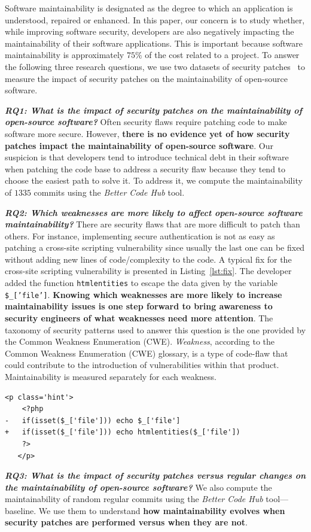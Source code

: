 \documentclass[10pt,conference]{IEEEtran}
\newcounter{lstannotation}
\begin{document}
Software maintainability is designated as the degree to which an application is understood, 
repaired or enhanced. In this paper, our concern is to study whether, while improving software
security, developers are also negatively impacting the maintainability of their
software applications. This is important because software maintainability is 
approximately $75\%$ of the cost related to a project. To answer the following three 
research questions, we use two datasets of security patches~\cite{Reis:2017:IJSSE, 10.1109/MSR.2019.00064} 
to measure the impact of security patches on the maintainability of open-source software. 
%

\textit{\textbf{RQ1: What is the impact of security patches on the
maintainability of open-source software?}} Often security flaws require patching 
code to make software more secure.
However, \textbf{there is no evidence yet of how security patches impact the
maintainability of open-source software}. Our suspicion is that developers tend
to introduce technical debt in their software when patching the code base to
address a security flaw because they tend to choose the easiest path to solve
it. To address it, we compute the maintainability of $1335$ commits using the
\emph{Better Code Hub} tool. 
%

\textit{\textbf{RQ2: Which weaknesses are more likely to
affect open-source software maintainability?}}
There are security flaws that are more difficult to patch than others. For
instance, implementing secure authentication is not as easy as patching a
cross-site scripting vulnerability since usually the last one can be fixed
without adding new lines of code/complexity to the code. A typical fix for 
the cross-site scripting vulnerability is presented in Listing~\ref{lst:fix}. 
The developer added the function \texttt{htmlentities} to escape the data given by the variable
\texttt{\$\_['file']}. \textbf{Knowing which weaknesses are more likely to increase
maintainability issues is one step forward to bring awareness to security
engineers of what weaknesses need more attention}. The taxonomy of security
patterns used to answer this question is the one provided by the Common Weakness Enumeration
(CWE). \emph{Weakness}, according to the Common Weakness Enumeration (CWE) glossary, 
is a type of code-flaw that could contribute to the 
introduction of vulnerabilities within that product. Maintainability is measured
separately for each weakness.
%
\setcounter{lstannotation}{0}
\begin{lstlisting}[style={PHPStyle}, caption={Fix provided by \texttt{nextcloud/server} developers to a \\Cross-Site Scripting vulnerability},label={lst:fix}]
   <p class='hint'>
    <?php
-   if(isset($_['file'])) echo $_['file']
+   if(isset($_['file'])) echo htmlentities($_['file'])
    ?>
   </p>
\end{lstlisting}
%
\textit{\textbf{RQ3: What is the impact of security patches versus regular changes on the
maintainability of open-source software?}}
%
We also compute the maintainability of random regular commits using the
\emph{Better Code Hub} tool---baseline.  We use them to understand \textbf{how
maintainability evolves when security patches are performed versus when
they are not}.
%
\end{document}
